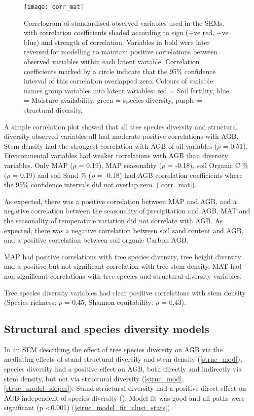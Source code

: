\documentclass[11pt,a4paper]{article}
\begin{document}
\begin{figure}[H]
\centering
	\texttt{[image: corr\_mat]}
	\caption{Correlogram of standardised observed variables used in the SEMs, with correlation coefficients shaded according to sign ($+$ve red, $-$ve blue) and strength of correlation. Variables in bold were later reversed for modelling to maintain positive correlations between observed variables within each latent variable. Correlation coefficients marked by a circle indicate that the 95\% confidence interval of this correlation overlapped zero. Colours of variable names group variables into latent variables: red = Soil fertility, blue = Moisture availability, green = species diversity, purple = structural diversity.}
	\label{corr_mat}
\end{figure}

A simple correlation plot showed that all tree species diversity and structural diversity observed variables all had moderate positive correlations with AGB. Stem density had the strongest correlation with AGB of all variables ($\rho$ = 0.51). Environmental variables had weaker correlations with AGB than diversity variables. Only MAP ($\rho$ = 0.19), MAP seasonality ($\rho$ = -0.18), soil Organic C \% ($\rho$ = 0.19) and soil Sand \% ($\rho$ = -0.18) had AGB correlation coefficients where the 95\% confidence intervals did not overlap zero. (\autoref{corr_mat}). 

As expected, there was a positive correlation between MAP and AGB, and a negative correlation between the seasonality of precipitation and AGB. MAT and the seasonality of temperature variation did not correlate with AGB. As expected, there was a negative correlation between soil sand content and AGB, and a positive correlation between soil organic Carbon AGB.

MAP had positive correlations with tree species diversity, tree height diversity and a positive but not significant correlation with tree stem density. MAT had non significant correlations with tree species and structural diversity variables.

Tree species diversity variables had clear positive correlations with stem density (Species richness: $\rho$ = 0.45, Shannon equitability: $\rho$ = 0.43). 

\subsection{Structural and species diversity models}

In an SEM describing the effect of tree species diversity on AGB via the mediating effects of stand structural diversity and stem density (\autoref{struc_mod}), species diversity had a positive effect on AGB, both directly and indirectly via stem density, but not via structural diversity (\autoref{struc_mod}, \autoref{struc_model_slopes}). Stand structural diversity had a positive direct effect on AGB independent of species diversity (). Model fit was good and all paths were significant (p <0.001) (\autoref{struc_model_fit_clust_stats}). 
\end{document}
